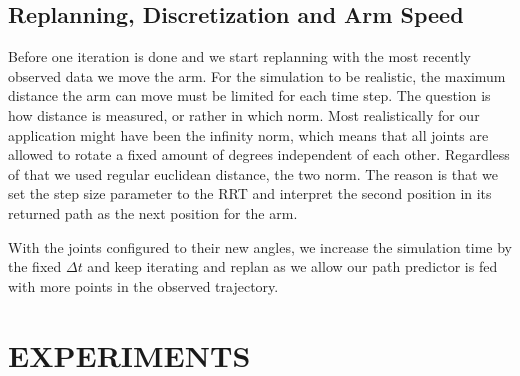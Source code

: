 \documentclass[letterpaper, 10 pt, conference]{ieeeconf}  %
\begin{document}

\subsection{Replanning, Discretization and Arm Speed}

Before one iteration is done and we start replanning with the most recently
observed data we move the arm. For the simulation to be realistic, the  maximum
distance the arm can move must be limited for each time step. The question is
how distance is measured, or rather in which norm. Most realistically for our
application might have been the infinity norm, which means that all joints are
allowed to rotate a fixed amount of degrees independent of each other.
Regardless of that we used regular euclidean distance, the two norm. The reason
is that we set the step size parameter to the RRT and interpret the second
position in its returned path as the next position for the arm.

With the joints configured to their new angles, we increase the
simulation time by the fixed $\Delta t$ and keep iterating and replan as
we allow our path predictor is fed with more points in the observed trajectory.

\section{EXPERIMENTS}
\end{document}
